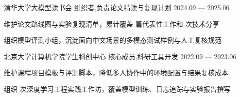 

\Campus
  {清华大学大模型读书会}
  {组织者\sep 负责论文精读与复现计划}
  {2024.09 — 2025.06}
\begin{Bullets}
  \item 维护论文路线图与实验复现清单，累计覆盖  篇代表性工作和  次技术分享
  \item 组织模型评测小组，沉淀面向中文场景的多模态测试样例与人工复核规范
\end{Bullets}

\Campus
  {北京大学计算机学院学生科创中心}
  {核心成员\sep 科研工具开发}
  {2022.09 — 2023.06}
\begin{Bullets}
  \item 维护课程项目模板与评测脚本，降低多人协作中的环境配置与结果复核成本
  \item 组织  次深度学习工程实践工作坊，覆盖模型训练、日志追踪与实验报告撰写
\end{Bullets}
